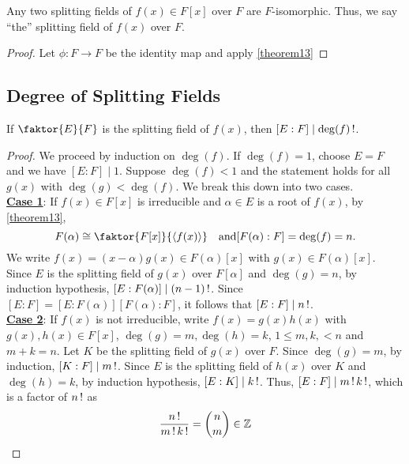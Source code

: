 \documentclass[11pt]{article}
\newcommand{\cyclic}[1]{\left\langle #1 \right\rangle}
\newcommand{\quotient}[2]{\faktor{#1}{#2}}
\begin{document}
\begin{corollary}\label{corollary14}
Any two splitting fields of $f(x) \in F[x]$ over $F$ are $F$-isomorphic. Thus,
we say ``the'' splitting field of $f(x)$ over $F$.
\end{corollary}
\begin{proof}
Let $\phi:F \to F$ be the identity map and apply \cref{theorem13}
\end{proof}

\subsection{Degree of Splitting Fields}

\begin{theorem}
If $\quotient{E}{F}$ is the splitting field of $f(x)$, then $[E:F] \mid
\deg(f)\operatorname{!}$.
\label{theorem14}
\end{theorem}
\begin{proof}
We proceed by induction on $\deg(f)$. If $\deg(f) = 1$, choose $E = F$ and we
have $[E:F] \mid 1$. Suppose $\deg(f) < 1$ and the statement holds for all
$g(x)$ with $\deg(g) < \deg(f)$. We break this down into two cases.\\
\underline{\bf Case 1}: If $f(x) \in F[x]$ is irreducible and $\alpha \in E$ is
a root of $f(x)$, by \cref{theorem13},
\begin{equation*}
F(\alpha) \cong \quotient{F[x]}{\cyclic{f(x)}} \quad \text{and} [F(\alpha):F] =
\deg(f) = n.
\end{equation*}
We write $f(x) = (x-\alpha)g(x) \in F(\alpha)[x]$ with $g(x) \in
F(\alpha)[x]$. Since $E$ is the splitting field of $g(x)$ over $F[\alpha]$ and
$\deg(g) = n$, by induction hypothesis, $[E:F(\alpha)] \mid (n-1)\operatorname{!}$. Since
$[E:F] = [E:F(\alpha)][F(\alpha):F]$, it follows that $[E:F] \mid n\operatorname{!}$.\\
\underline{\bf Case 2}: If $f(x)$ is not irreducible, write $f(x) = g(x)h(x)$
with $g(x),h(x) \in F[x]$, $\deg(g)=m, \deg(h) = k$, $1 \leq m,k, < n$ and
$m + k = n$. Let $K$ be the splitting field of $g(x)$ over $F$. Since $\deg(g) =
m$, by induction, $[K:F] \mid m\operatorname{!}$. Since $E$ is the splitting field of
$h(x)$ over $K$ and $\deg(h) = k$, by induction hypothesis, $[E:K] \mid k\operatorname{!}$.
Thus, $[E:F] \mid m\operatorname{!} k\operatorname{!}$, which is a factor of $n\operatorname{!}$ as
\begin{equation*}
\frac{n\operatorname{!}}{m \operatorname{!} k\operatorname{!}} = \binom{n}{m} \in \mathbb{Z}
\end{equation*}
\end{proof}
\end{document}
